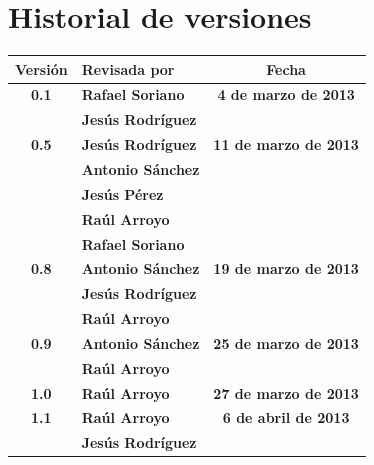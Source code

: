 \documentclass[a4paper,11pt]{article}
\begin{document}
    \section{Historial de versiones}
        \begin{center}
            \begin{tabular}{| c | l | c |}
    			\hline
				\cellcolor[RGB]{224,233,250}\textbf{Versión} & \cellcolor[RGB]{224,233,250}\textbf{Revisada por} & 						\cellcolor[RGB]{224,233,250}\textbf{Fecha} \\
				\hline
				\textbf{0.1} & \textbf{Rafael Soriano} & \textbf{4 de marzo de 2013} \\
				 & \textbf{Jesús Rodríguez} &  \\
				\hline
				\textbf{0.5} & \textbf{Jesús Rodríguez} & \textbf{11 de marzo de 2013} \\
				 & \textbf{Antonio Sánchez} &  \\
				 & \textbf{Jesús Pérez} &  \\
				 & \textbf{Raúl Arroyo} &  \\
				 & \textbf{Rafael Soriano} &  \\
				\hline
				\textbf{0.8} & \textbf{Antonio Sánchez} & \textbf{19 de marzo de 2013} \\
				 & \textbf{Jesús Rodríguez} &  \\
				 & \textbf{Raúl Arroyo} &  \\
				\hline
				\textbf{0.9} & \textbf{Antonio Sánchez} & \textbf{25 de marzo de 2013} \\
				 & \textbf{Raúl Arroyo} &  \\
				\hline
				\textbf{1.0} & \textbf{Raúl Arroyo} & \textbf{27 de marzo de 2013} \\
				\hline
				\textbf{1.1} & \textbf{Raúl Arroyo} & \textbf{6 de abril de 2013} \\
				 & \textbf{Jesús Rodríguez} &  \\
				\hline
			\end{tabular}
        \end{center}
\end{document}
